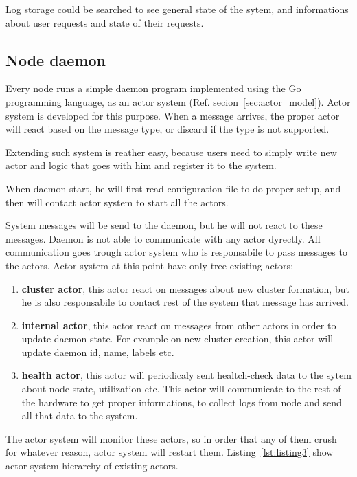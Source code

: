Log storage could be searched to see general state of the sytem, and informations about user requests and state of their requests.
%
%
\subsection{Node daemon}\label{sec:node_daemon}
Every node runs a simple daemon program implemented using the Go programming language, as an actor system (Ref. secion~\ref{sec:actor_model}). Actor system is developed for this purpose. When a message arrives, the proper actor will react based on the message type, or discard if the type is not supported. 

Extending such system is reather easy, because users need to simply write new actor and logic that goes with him and register it to the system.

When daemon start, he will first read configuration file to do proper setup, and then will contact actor system to start all the actors. 

System messages will be send to the daemon, but he will not react to these messages. Daemon is not able to communicate with any actor dyrectly. All communication goes trough actor system who is responsabile to pass messages to the actors. Actor system at this point have only tree existing actors:

\begin{enumerate}[start=1,label={(\bfseries \arabic*)}]
	\item \textbf{cluster actor}, this actor react on messages about new cluster formation, but he is also responsabile to contact rest of the system that message has arrived.
	\item \textbf{internal actor}, this actor react on messages from other actors in order to update daemon state. For example on new cluster creation, this actor will update daemon id, name, labels etc.
	\item \textbf{health actor}, this actor will periodicaly sent healtch-check data to the sytem about node state, utilization etc. This actor will communicate to the rest of the hardware to get proper informations, to collect logs from node and send all that data to the system.
\end{enumerate}

The actor system will monitor these actors, so in order that any of them crush for whatever reason, actor system will restart them. Listing~\ref{lst:listing3} show actor system hierarchy of existing actors.

